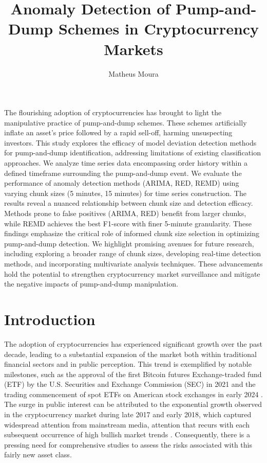 \documentclass[12pt]{article}
\title{Anomaly Detection of Pump-and-Dump Schemes in Cryptocurrency Markets}
\author{Matheus Moura\inst{1}}
\begin{document}
 
	
	\maketitle
	
	\begin{resumo} 
		The flourishing adoption of cryptocurrencies has brought to light the manipulative practice of pump-and-dump schemes.
		These schemes artificially inflate an asset's price followed by a rapid sell-off, harming unsuspecting investors. This study explores the efficacy of model deviation detection methods for pump-and-dump identification, addressing limitations of existing classification approaches. We analyze time series data encompassing order history within a defined timeframe surrounding the pump-and-dump event.
		We evaluate the performance of anomaly detection methods (ARIMA, RED, REMD) using varying chunk sizes (5 minutes, 15 minutes) for time series construction.
		The results reveal a nuanced relationship between chunk size and detection efficacy.
		Methods prone to false positives (ARIMA, RED) benefit from larger chunks, while REMD achieves the best F1-score with finer 5-minute granularity.
		These findings emphasize the critical role of informed chunk size selection in optimizing pump-and-dump detection. 
		We highlight promising avenues for future research, including exploring a broader range of chunk sizes, developing real-time detection methods, and incorporating multivariate analysis techniques.
		These advancements hold the potential to strengthen cryptocurrency market surveillance and mitigate the negative impacts of pump-and-dump manipulation.
	\end{resumo}
	
	\section{Introduction}
	\label{sec_introducao}

	The adoption of cryptocurrencies has experienced significant growth over the past decade, leading to a substantial expansion of the market both within traditional financial sectors and in public perception.
	This trend is exemplified by notable milestones, such as the approval of the first Bitcoin futures Exchange-traded fund (ETF) by the U.S. Securities and Exchange Commission (SEC) in 2021 \citep{wursthorn2021} and the trading commencement of spot ETFs on American stock exchanges in early 2024 \citep{schmitt2024}.
	The surge in public interest can be attributed to the exponential growth observed in the cryptocurrency market during late 2017 and early 2018, which captured widespread attention from mainstream media, attention that recurs with each subsequent occurrence of high bullish market trends \citep{steinmetz2021}.
	Consequently, there is a pressing need for comprehensive studies to assess the risks associated with this fairly new asset class.
\end{document}
